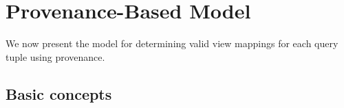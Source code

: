 \section{Provenance-Based Model}\label{sec: model}
We now present the model for determining valid view mappings for each query tuple using provenance.


\subsection{Basic concepts}\label{Sec: prelim}
